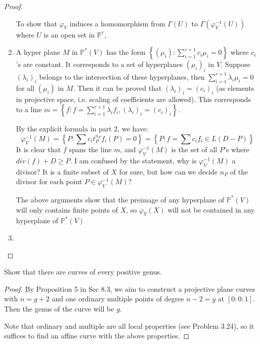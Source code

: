 \documentclass{solution}
\begin{document}
\begin{proof}
\begin{enumerate}
        To show that $\varphi_V$ induces a homomorphism from $\Gamma(U)$ to $\Gamma (\varphi_V ^{-1}(U))$ where $U$ is an open set in $\mathbb{P}^r$, \TODO
        \item A hyper plane $M$ in $\mathbb{P}^*(V)$ has the form $\left\lbrace (\mu_i): \sum\limits_{i = 1}^{r + 1} c_i \mu_i = 0 \right\rbrace$ where $c_i$'s are constant. It corresponds to a set of hyperplanes $(\mu_i)_i$ in $V$. Suppose $(\lambda_i)_i$ belongs to the intersection of these hyperplanes, then $\sum\limits_{i = 1}^{r + 1} \lambda_i \mu_i = 0$ for all $(\mu_i)$ in $M$. Then it can be proved that $(\lambda_i)_i = (c_i)_i$ (as elements in projective space, i.e. scaling of coefficients are allowed). This corresponds to a line $m = \left\lbrace f: f = \sum\limits_{i = 1}^{r + 1} \lambda_i f_i, (\lambda_i)_i = (c_i)_i \right\rbrace$.
        
        By the explicit formula in part 2, we have:
        $$\varphi_V ^{-1}(M) = \left\lbrace P: \sum c_i t_P^{n_P}f_i(P) = 0 \right\rbrace = \left\lbrace P: f = \sum c_i f_i \in L(D - P) \right\rbrace$$
        It is clear that $f$ spans the line $m$, and $\varphi_V ^{-1}(M)$ is the set of all $P$'s where $div(f) + D \ge P$. {\color{red} I am confused by the statement, why is $\varphi_V ^{-1}(M)$ a divisor? It is a finite subset of $X$ for sure, but how can we decide $n_P$ of the divisor for each point $P \in \varphi_V ^{-1}(M)$?}

        The above arguments show that the preimage of any hyperplane of $\mathbb{P}^*(V)$ will only contains finite points of $X$, so $\varphi_V(X)$ will not be contained in any hyperplane of $\mathbb{P}^*(V)$

        \item \TODO
    \end{enumerate}
\end{proof}

\begin{problem}{8.34}
    Show that there are curves of every positive genus.
\end{problem}

\begin{proof}
    By Proposition 5 in Sec 8.3, we aim to construct a projective plane curves with $n = g + 2$ and one ordinary multiple points of degree $n - 2 = g$ at $[0:0:1]$. Then the genus of the curve will be $g$.

    Note that ordinary and multiple are all local properties (see Problem 3.24), so it suffices to find an affine curve with the above properties.

    \TODO
\end{proof}
\end{document}
